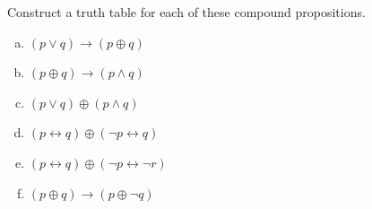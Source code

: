 \documentclass[a4paper,12pt,oneside,article]{memoir}
\begin{document}
\clearpage


\begin{tcolorbox}
	[colback=Emerald!10,colframe=cyan!40!black,title=\textbf{Question 35}]
	Construct a truth table for each of these compound propositions.
	\begin{enumerate}[a)]
		\item $(p \lor q) \rightarrow (p \oplus q) $
		\item $(p \oplus q) \rightarrow (p \land q)$
		\item $(p \lor q) \oplus (p \land q) $
		\item $(p \leftrightarrow q) \oplus (\lnot p \leftrightarrow q)$
		\item $(p \leftrightarrow q) \oplus (\lnot p \leftrightarrow \lnot r)$
		\item $(p \oplus q) \rightarrow (p \oplus \lnot q)$
	\end{enumerate}
\end{tcolorbox}
\end{document}
